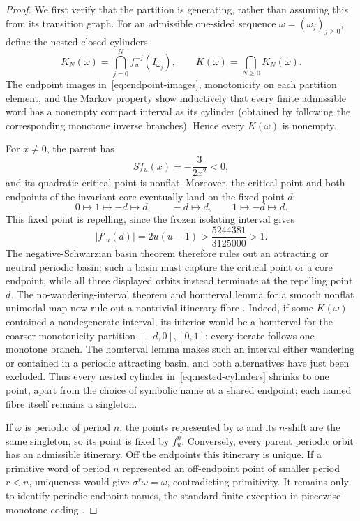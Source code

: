 \documentclass[11pt]{article}
\theoremstyle{definition}
\theoremstyle{remark}
\begin{document}
\begin{proof}
We first verify that the partition is generating, rather than assuming this
from its transition graph.  For an admissible one-sided sequence
\(\omega=(\omega_j)_{j\geq0}\), define the nested closed cylinders
\begin{equation}
 K_N(\omega)=\bigcap_{j=0}^{N} f_u^{-j}(I_{\omega_j}),
 \qquad K(\omega)=\bigcap_{N\geq0}K_N(\omega).
 \label{eq:nested-cylinders}
\end{equation}
The endpoint images in~\eqref{eq:endpoint-images}, monotonicity on each
partition element, and the Markov property show inductively that every finite
admissible word has a nonempty compact interval as its cylinder (obtained by
following the corresponding monotone inverse branches).  Hence every
\(K(\omega)\) is nonempty.

For \(x\ne0\), the parent has
\begin{equation}
 S f_u(x)=-\frac{3}{2x^2}<0,
 \label{eq:schwarzian}
\end{equation}
and its quadratic critical point is nonflat.  Moreover, the critical point
and both endpoints of the invariant core eventually land on the fixed point
\(d\):
\[
 0\mapsto1\mapsto-d\mapsto d,
 \qquad -d\mapsto d,
 \qquad 1\mapsto-d\mapsto d.
\]
This fixed point is repelling, since the frozen isolating interval gives
\begin{equation}
 |f'_u(d)|=2u(u-1)>
 \frac{5244381}{3125000}>1.
 \label{eq:repelling-d}
\end{equation}
The negative-Schwarzian basin theorem therefore rules out an attracting or
neutral periodic basin: such a basin must capture the critical point or a
core endpoint, while all three displayed orbits instead terminate at the
repelling point \(d\).  The no-wandering-interval theorem and homterval lemma
for a smooth nonflat unimodal map now rule out a nontrivial itinerary fibre
\citep[Chapter~II, Lemma~3.1 and Theorems~6.1--6.2]{demelo1993one}.
Indeed, if some \(K(\omega)\) contained a nondegenerate
interval, its interior would be a homterval for the coarser monotonicity
partition \([-d,0],[0,1]\): every iterate follows one monotone branch.  The
homterval lemma makes such an interval either wandering or contained in a
periodic attracting basin, and both alternatives have just been excluded.
Thus every nested cylinder in~\eqref{eq:nested-cylinders} shrinks to one
point, apart from the choice of symbolic name at a shared endpoint; each
named fibre itself remains a singleton.

If \(\omega\) is periodic of period \(n\), the points represented by
\(\omega\) and its \(n\)-shift are the same singleton, so its point is fixed
by \(f_u^n\).  Conversely, every parent periodic orbit has an admissible
itinerary.  Off the endpoints this itinerary is unique.  If a primitive word
of period \(n\) represented an off-endpoint point of smaller period \(r<n\),
uniqueness would give \(\sigma^r\omega=\omega\), contradicting primitivity.
It remains only to identify periodic endpoint names, the standard finite
exception in piecewise-monotone coding \citep{hofbauer1985periodic}.


\end{proof}
\end{document}
